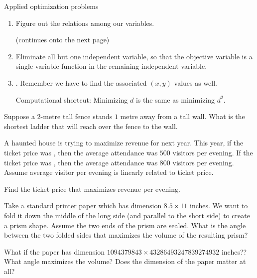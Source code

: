 \documentclass[../main.tex]{subfiles}
\begin{document}
\begin{lesson}{Applied optimization problems}
\begin{example}
\begin{enumerate}
      \item Figure out the relations among our variables. 

        \vfill{}{\footnotesize (continues onto the next page)} \clearpage

      \item Eliminate all but one independent variable, so that the objective variable is a single-variable function in the remaining independent variable. 

      \item {}. Remember we have to find the associated \((x,y)\) values as well. 

        Computational shortcut: Minimizing \(d\) is the same as minimizing \(d^{2}\).
    \end{enumerate}
  \end{example}
  \clearpage

  \clearpage

  \begin{example} \label{ex:optimization-ladder}
    Suppose a \(2\)-metre tall fence stands \(1\) metre away from a tall wall.  What is the shortest ladder that will reach over the fence to the wall.
  \end{example}

  \begin{example}
    A haunted house is trying to maximize revenue for next year. This year, if the ticket price was , then the average attendance was \(500\) visitors per evening. If the ticket price was , then the average attendance was \(800\) visitors per evening.  Assume average visitor per evening is linearly related to ticket price.

    Find the ticket price that maximizes revenue per evening. 
  \end{example}

  \begin{example}
    Take a standard printer paper which has dimension \(8.5 \times 11\) inches. We want to fold it down the middle of the long side (and parallel to the short side) to create a prism shape. Assume the two ends of the prism are sealed. What is the angle between the two folded sides that maximizes the volume of the resulting prism?


    \faComment{} What if the paper has dimension \(1094379843 \times 43286493247839274932\) inches?? What angle maximizes the volume? Does the dimension of the paper matter at all?
  \end{example}
\end{lesson}
\end{document}
